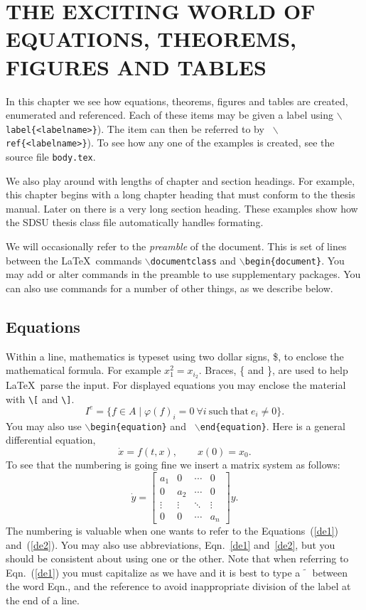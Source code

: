 \chapter{THE EXCITING WORLD OF EQUATIONS,
THEOREMS, FIGURES AND TABLES}
\label{c:main}
In this chapter we see how equations, theorems,
figures and tables are created, enumerated and referenced.
Each of these items may be given a label
using {\tt $\backslash$label\{<labelname>\}}).
The item can then be referred to by {\tt
$\backslash$ref\{<labelname>\}}).
To see how any one of the examples is created, see the source file {\tt body.tex}.

We also play around with lengths of chapter and section headings.
For example, this chapter begins with a long chapter heading that must conform to the
thesis manual.  Later on there is a very long section heading.  These
examples show how the SDSU thesis class file automatically handles
formating.

We will occasionally refer to the {\it preamble} of the document.
This is set of  lines between the \LaTeX\
commands {\tt $\backslash$documentclass} and {\tt $\backslash$begin\{document\}}.
You may add or alter commands in the preamble to use supplementary
packages.  You can also use commands for a number of other things, as
we describe below.


\section{Equations}
\label{s:equations}
Within a line, mathematics is typeset using two dollar signs, \$, to
enclose the mathematical formula. For example $x_1^2 = x_{i_2}$.
Braces, \{ and \}, are used to help \LaTeX\ parse the input.
For displayed equations you may enclose the material with \verb+\[+
and \verb+\]+.
\[
I^e=\{f\in A\mid
\varphi(f)_i =0\ \forall i \mathrm{\ such\ that\ }
e_i\not=0\}.
\]
You may also use {\tt $\backslash$begin\{equation\}} and  {\tt
  $\backslash$end\{equation\}}. 
Here is a general differential equation,
\begin{equation}
\dot{x} = f(t,x),\qquad x(0)= x_0. \label{de1}
\end{equation}
To see that the numbering is going fine we insert a matrix system as
follows:
\begin{equation}
\dot{y} =
\begin{bmatrix}
a_1 & 0 & \cdots & 0 \\
0 & a_2 & \cdots & 0 \\
\vdots & \vdots & \ddots & \vdots \\
0 & 0 & \cdots & a_n
\end{bmatrix}
y.
\label{de2}
\end{equation}
The numbering is valuable when one wants to refer to the
Equations~(\ref{de1}) and~(\ref{de2}). You may also use abbreviations,
Eqn.~\eqref{de1} and~\eqref{de2}, but you should be consistent
about using one or the other.
Note that when referring to
Eqn.~(\ref{de1}) you must capitalize as we have
and it is best to type 
 a $\tilde{\phantom{x}}$ between the word Eqn., and the reference to avoid
inappropriate division of the label at the end of a line.

